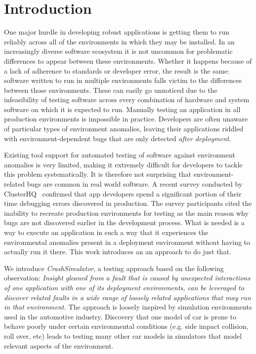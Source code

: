 \section{Introduction}

One major hurdle in developing robust applications is getting them to run reliably across all of the environments in
which they may be installed.  In an increasingly diverse software ecosystem it is not uncommon for problematic
differences to appear between these environments.  Whether it happens because of a lack of adherence to standards or
developer error, the result is the same: software written to run in multiple environments falls victim to the
differences between those environments.  These can easily go unnoticed due to the infeasibility of testing software
across every combination of hardware and system software on which it is expected to run.  Manually testing an application in
all production environments is impossible in practice. Developers are often unaware of particular types of environment
anomalies, leaving their applications riddled with environment-dependent bugs that are only detected \emph{after
  deployment}.

Existing tool support for automated testing of software against environment anomalies is very limited, making it
extremely difficult for developers to tackle this problem systematically.  It is therefore not surprising that
environment-related bugs are common in real world software. A recent survey conducted by
ClusterHQ~\cite{ClusterHQSurvey} confirmed that app developers spend a significant portion of their time debugging
errors discovered in production.  The survey participants cited the inability to recreate production environments for
testing as the main reason why bugs are not discovered earlier in the development process.  What is needed is a way to
execute an application in such a way that it experiences the environmental anomalies present in a deployment environment
without having to actually run it there.  This work introduces an an approach to do just that.

We introduce {\em CrashSimulator}, a testing approach based on the following observation:
{\em Insight gleaned from a fault that is caused by unexpected interactions 
of {\em one application} with one of its deployment environments, can be leveraged 
to discover related faults in a {\em wide range} of loosely related applications that may run in that environment.}
The approach is loosely inspired by simulation environments used in the automotive industry. Discovery
that one model of car is prone to behave poorly under certain environmental conditions (e.g. side impact collision,
roll over, etc) leads to testing many other car models in simulators that model relevant aspects of the environment.

